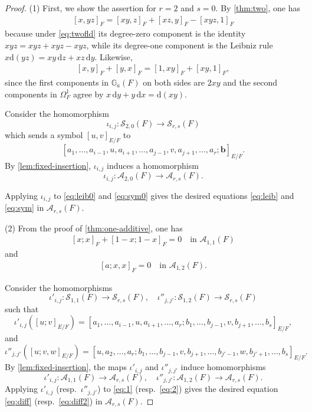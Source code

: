 \documentclass[a4paper,12pt,reqno]{amsart}
\numberwithin{equation}{section}
\theoremstyle{definition}
\newcommand{\Ga}{\mathbb{G}_{a}}
\renewcommand{\d}{\mathrm{d}}
\newcommand{\Acal}{\mathcal{A}}
\newcommand{\vb}{\mathbf{b}}
\begin{document}
\begin{proof}
\noindent (1)
First, we show the assertion for $r=2$ and $s=0$. 
By \autoref{thm:two}, one has
\begin{align}\label{eq:leib0}
 [x,yz]_F
 =
 [xy,z]_F+[xz,y]_F-[xyz,1]_F
\end{align}
because under \eqref{eq:twofld} its degree-zero component is the identity
$xyz=xyz+xyz-xyz$, while its degree-one component is the Leibniz rule
$x\d(yz)=xy\,\d z+xz\,\d y$.
Likewise,
\begin{align}\label{eq:sym0}
     [x,y]_F+[y,x]_F=[1,xy]_F+[xy,1]_F,
\end{align}
since the first components in $\Ga(F)$ 
on both sides are $2xy$ and the
second components in $\Omega^1_F$ agree by
$x\,\d y+y\,\d x=\d(xy)$.

Consider the homomorphism
\begin{equation}\label{eq:insert-two}
 \iota_{i,j}:\mathcal S_{2,0}(F)\to\mathcal S_{r,s}(F)
\end{equation}
which sends a symbol $[u,v]_{E/F}$ to
\[
 [a_1,\ldots,a_{i-1},u,a_{i+1},\ldots,
   a_{j-1},v,a_{j+1},\ldots,a_r;\vb]_{E/F}.
\]
By \autoref{lem:fixed-insertion}, 
$\iota_{i,j}$ induces a homomorphism
\begin{equation}\label{eq:insert-two-Ar}
 \iota_{i,j}:\Acal_{2,0}(F)\to\Acal_{r,s}(F).
\end{equation}



Applying $\iota_{i,j}$ to \eqref{eq:leib0} and \eqref{eq:sym0} gives the desired equations \eqref{eq:leib} and \eqref{eq:sym} in $\Acal_{r,s}(F)$.

\smallskip
\noindent (2)
From the proof of \autoref{thm:one-additive}, one has
\begin{align}\label{eq:1}
    [x;x]_F+[1-x;1-x]_F=0 \quad \text{in $\Acal_{1,1}(F)$}
\end{align}
and
\begin{align}\label{eq:2}
    [a;x,x]_F=0 \quad \text{in $\Acal_{1,2}(F)$}.
\end{align}

Consider the homomorphisms
\begin{equation}\label{eq:insert-two2}
 \iota'_{i,j}:\mathcal S_{1,1}(F)\to\mathcal S_{r,s}(F),\quad 
\iota''_{j,j'}: \mathcal{S}_{1,2}(F)\to \mathcal{S}_{r,s}(F)
\end{equation}
such that
\[
 \iota'_{i,j}([u;v]_{E/F})=[a_1,\ldots,a_{i-1},u,a_{i+1},\ldots,a_r;b_1,\dots,b_{j-1},v,b_{j+1},\dots,b_s]_{E/F},
\]
and 
\[
 \iota''_{j,j'}([u;v,w]_{E/F})=[u,a_2,\ldots,a_r;b_1,\dots,b_{j-1},v,b_{j+1},\dots,b_{j'-1},w,b_{j'+1},\dots,b_s]_{E/F}.
\]
By \autoref{lem:fixed-insertion},   %
the maps $\iota'_{i,j}$ and $\iota''_{j,j'}$ induce homomorphisms
\begin{equation}\label{eq:insert-mixed-Ar}
 \iota'_{i,j}:\Acal_{1,1}(F)\to\Acal_{r,s}(F),\quad \iota''_{j,j'}: \Acal_{1,2}(F)\to \Acal_{r,s}(F).
\end{equation}
Applying $\iota'_{i,j}$ (resp.~$\iota''_{j,j'}$) to \eqref{eq:1} (resp.~\eqref{eq:2}) gives the desired equation \eqref{eq:diff} (resp.~\eqref{eq:diff2}) in $\Acal_{r,s}(F)$.
\end{proof}
\end{document}
